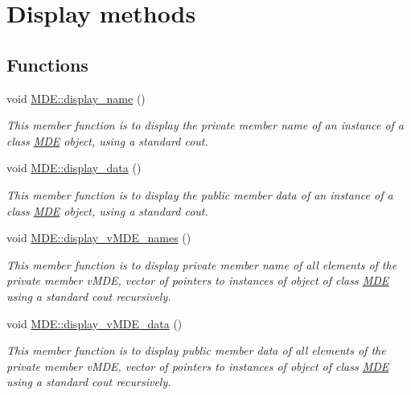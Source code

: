 \hypertarget{group__group__display}{}\section{Display methods}
\label{group__group__display}
\subsection*{Functions}
\begin{DoxyCompactItemize}
\item 
void \hyperlink{group__group__display_ga0d7ee634770bb7ca539a0db883bf5fcb}{M\+D\+E\+::display\+\_\+name} ()
\begin{DoxyCompactList}\small\item\em This member function is to display the private member \textquotesingle{}name\textquotesingle{} of an instance of a class \hyperlink{classMDE}{M\+DE} object, using a standard cout. \end{DoxyCompactList}\item 
void \hyperlink{group__group__display_gaffa6663eb89b6e57cb430677067efe8e}{M\+D\+E\+::display\+\_\+data} ()
\begin{DoxyCompactList}\small\item\em This member function is to display the public member \textquotesingle{}data\textquotesingle{} of an instance of a class \hyperlink{classMDE}{M\+DE} object, using a standard cout. \end{DoxyCompactList}\item 
void \hyperlink{group__group__display_gaeabe618359d94d130bcd4bc878ce3edc}{M\+D\+E\+::display\+\_\+v\+M\+D\+E\+\_\+names} ()
\begin{DoxyCompactList}\small\item\em This member function is to display private member \textquotesingle{}name\textquotesingle{} of all elements of the private member v\+M\+DE, vector of pointers to instances of object of class \hyperlink{classMDE}{M\+DE} using a standard cout recursively. \end{DoxyCompactList}\item 
void \hyperlink{group__group__display_ga5ce5603ab12845a6f1bdb2f909b5ef16}{M\+D\+E\+::display\+\_\+v\+M\+D\+E\+\_\+data} ()
\begin{DoxyCompactList}\small\item\em This member function is to display public member \textquotesingle{}data\textquotesingle{} of all elements of the private member v\+M\+DE, vector of pointers to instances of object of class \hyperlink{classMDE}{M\+DE} using a standard cout recursively. \end{DoxyCompactList}\item 

\end{DoxyCompactItemize}
